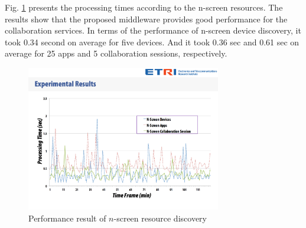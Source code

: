 \documentclass[conference]{IEEEtran}
\begin{document}
    \begin{table}[htb]
    \caption{Test Setup for Performance Evaluation}
    \label{tlb:setup}
    \end{table}

Fig. \ref{fig:performance} presents the processing times according to the n-screen resources. The results show that the proposed middleware provides good performance for the collaboration services. In terms of the performance of n-screen device discovery, it took 0.34 second on average for five devices. And it took 0.36 sec and 0.61 sec on average for 25 apps and 5 collaboration sessions, respectively.

    \begin{figure}[htb] %
    \centering
    \includegraphics[width=8.5cm,keepaspectratio]{performance}
    \caption{Performance result of $n$-screen resource discovery}
    \label{fig:performance}
    \end{figure}
\end{document}
